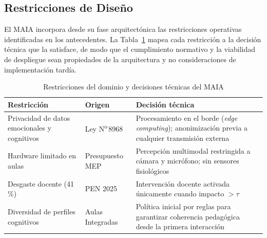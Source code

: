 \subsection{Restricciones de Diseño}

El MAIA incorpora desde su fase arquitectónica las restricciones operativas
identificadas en los antecedentes. La Tabla~\ref{tab:restricciones} mapea
cada restricción a la decisión técnica que la satisface, de modo que el
cumplimiento normativo y la viabilidad de despliegue sean propiedades de
la arquitectura y no consideraciones de implementación tardía.

\begin{table}[htbp]
\caption{Restricciones del dominio y decisiones técnicas del MAIA}
\label{tab:restricciones}
\renewcommand{\arraystretch}{1.35}
\begin{tabular}{p{1.8cm}p{1.5cm}p{3.8cm}}
\toprule
\textbf{Restricción} & \textbf{Origen} & \textbf{Decisión técnica} \\
\midrule
Privacidad de datos emocionales y cognitivos &
    Ley N\textsuperscript{o}\,8968 &
    Procesamiento en el borde (\textit{edge computing}); anonimización
    previa a cualquier transmisión externa \\
\midrule
Hardware limitado en aulas &
    Presupuesto MEP &
    Percepción multimodal restringida a cámara y micrófono; sin sensores
    fisiológicos \\
\midrule
Desgaste docente (41\,\%) &
    PEN 2025 &
    Intervención docente activada únicamente cuando impacto $> \tau$ \\
\midrule
Diversidad de perfiles cognitivos &
    Aulas Integradas &
    Política inicial por reglas para garantizar coherencia pedagógica desde
    la primera interacción \\
\bottomrule
\end{tabular}
\end{table}
\newpage
